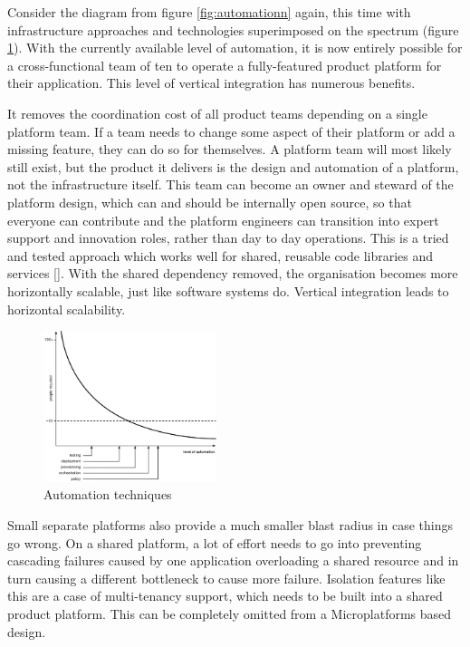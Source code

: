 \documentclass[reprint,amsmath,amssymb,aps]{revtex4-1}
\begin{document}
Consider the diagram from figure \ref{fig:automationn} again, this time with infrastructure approaches and technologies superimposed on the spectrum (figure \ref{fig:automation-techniques}). With the currently available level of automation, it is now entirely possible for a cross-functional team of ten to operate a fully-featured product platform for their application. This level of vertical integration has numerous benefits.

It removes the coordination cost of all product teams depending on a single platform team. If a team needs to change some aspect of their platform or add a missing feature, they can do so for themselves. A platform team will most likely still exist, but the product it delivers is the design and automation of a platform, not the infrastructure itself. This team can become an owner and steward of the platform design, which can and should be internally open source, so that everyone can contribute and the platform engineers can transition into expert support and innovation roles, rather than day to day operations. This is a tried and tested approach which works well for shared, reusable code libraries and services []. With the shared dependency removed, the organisation becomes more horizontally scalable, just like software systems do. Vertical integration leads to horizontal scalability.

\begin{figure}[h]
        \includegraphics[width=0.45\textwidth]{figs/automation-tools}
        \caption{Automation techniques}
        \label{fig:automation-techniques}
\end{figure}

Small separate platforms also provide a much smaller blast radius in case things go wrong. On a shared platform, a lot of effort needs to go into preventing cascading failures caused by one application overloading a shared resource and in turn causing a different bottleneck to cause more failure. Isolation features like this are a case of multi-tenancy support, which needs to be built into a shared product platform. This can be completely omitted from a Microplatforms based design.
\end{document}
